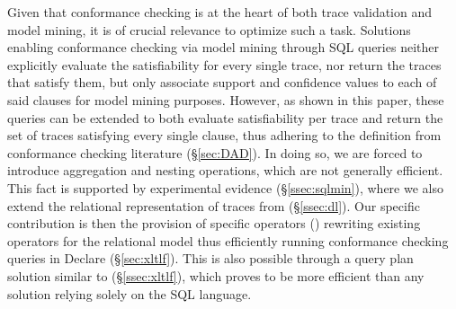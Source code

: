 Given that conformance checking is at the heart of both trace validation and model mining, it is of crucial relevance to optimize such a task.
Solutions enabling conformance checking via model mining through SQL queries \cite{Schonig15,SchonigRCJM16}  neither explicitly evaluate the satisfiability for every single trace, nor return the traces that satisfy them, but only associate support and confidence values to each of said clauses for model mining purposes. However, as shown in this paper,  these queries can be extended to both 
evaluate satisfiability per trace and return the set of traces satisfying every single clause, thus adhering to the definition from conformance checking literature (\S\ref{sec:DAD}). In doing so,  we are forced to introduce  aggregation and nesting operations, which are not generally efficient. This fact is supported by experimental evidence (\S\ref{ssec:sqlmin}), where we also extend the relational representation of traces from \cite{Schonig15,SchonigRCJM16} (\S\ref{ssec:dl}). Our specific contribution is then the provision of specific operators (\xLTLf) rewriting existing \LTLf operators for the relational  model thus efficiently running conformance checking queries in Declare (\S\ref{sec:xltlf}). This is also possible through a query plan solution similar to  \cite{BellatrecheKB21} (\S\ref{ssec:xltlf}), which  proves to be more efficient than any solution relying solely on the SQL language. 

